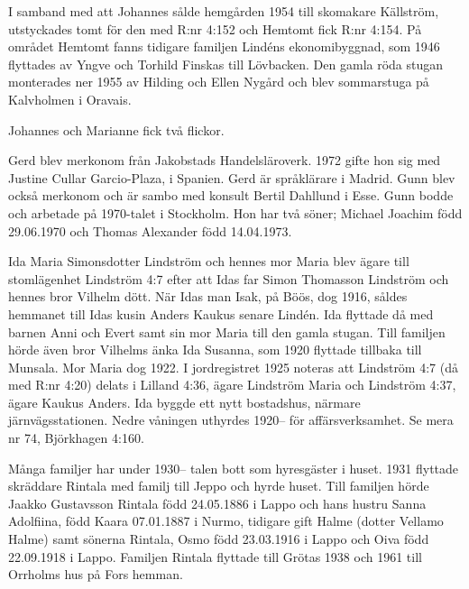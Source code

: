 I samband med att Johannes sålde hemgården 1954 till skomakare Källström, utstyckades tomt för den med R:nr 4:152 och Hemtomt fick R:nr 4:154. På området Hemtomt fanns tidigare familjen Lindéns ekonomibyggnad, som 1946 flyttades av Yngve och Torhild Finskas till Lövbacken. Den gamla röda stugan monterades ner 1955 av Hilding och Ellen Nygård och blev sommarstuga på Kalvholmen i Oravais.

Johannes och Marianne fick två flickor.
\begin{jhchildren}
  \item {}
  \item {}
\end{jhchildren}
Gerd blev merkonom från Jakobstads Handelsläroverk. 1972 gifte hon sig med Justine Cullar Garcio-Plaza,  i Spanien. Gerd är språklärare i Madrid. Gunn blev också merkonom och är sambo med konsult Bertil Dahllund i Esse. Gunn bodde och arbetade på 1970-talet i Stockholm. Hon har två söner; Michael Joachim född 29.06.1970 och Thomas Alexander född 14.04.1973.


Ida Maria Simonsdotter Lindström och hennes mor Maria blev ägare till stomlägenhet Lindström 4:7 efter att Idas far Simon Thomasson Lindström och hennes bror Vilhelm dött. När Idas man Isak,  på Böös, dog 1916, såldes hemmanet till Idas kusin Anders Kaukus senare Lindén. Ida flyttade då med barnen Anni och Evert samt sin mor Maria till den gamla stugan. Till familjen hörde även bror Vilhelms änka Ida Susanna, som 1920 flyttade tillbaka till Munsala. Mor Maria dog 1922. I jordregistret 1925 noteras att Lindström 4:7 (då med R:nr 4:20) delats i Lilland 4:36, ägare Lindström Maria och Lindström 4:37, ägare Kaukus Anders. Ida byggde ett nytt bostadshus, närmare järnvägsstationen. Nedre våningen uthyrdes 1920-- för affärsverksamhet. Se mera nr 74, Björkhagen 4:160.



Många familjer har under 1930-- talen bott som hyresgäster i huset. 1931 flyttade skräddare Rintala med familj till Jeppo och hyrde huset. Till familjen hörde Jaakko Gustavsson Rintala född 24.05.1886 i Lappo och hans hustru Sanna Adolfiina, född Kaara 07.01.1887 i Nurmo, tidigare gift Halme (dotter Vellamo Halme) samt sönerna Rintala, Osmo född 23.03.1916 i Lappo och Oiva född 22.09.1918 i Lappo. Familjen Rintala flyttade till Grötas 1938 och 1961 till Orrholms hus på Fors hemman.

